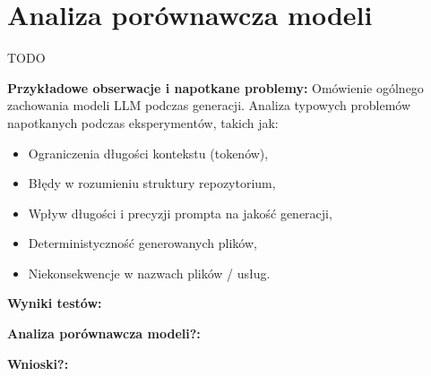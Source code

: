 \clearpage %
\section{Analiza porównawcza modeli}

TODO



\textbf{Przykładowe obserwacje i napotkane problemy:}
Omówienie ogólnego zachowania modeli LLM podczas generacji.
Analiza typowych problemów napotkanych podczas eksperymentów, takich jak:
\begin{itemize}
    \item Ograniczenia długości kontekstu (tokenów),
    \item Błędy w rozumieniu struktury repozytorium,
    \item Wpływ długości i precyzji prompta na jakość generacji,
    \item Deterministyczność generowanych plików,
    \item Niekonsekwencje w nazwach plików / usług.
\end{itemize}

\textbf{Wyniki testów:}

\textbf{Analiza porównawcza modeli?:}

\textbf{Wnioski?:}